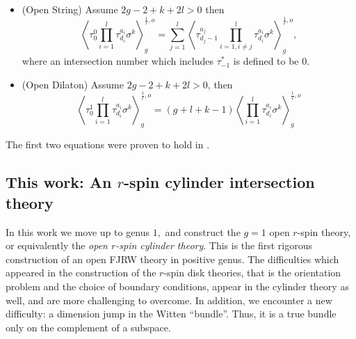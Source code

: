 \documentclass[11pt]{amsart}
\theoremstyle{definition}
\theoremstyle{remark}
\newcommand{\<}{\left<}
\renewcommand{\>}{\right>}
\numberwithin{equation}{section}
\begin{document}
\begin{itemize}
\begin{equation}
\begin{split}
&+\hspace{-0.1cm}\sum_{\substack{J_1 \sqcup J_2 =  [l]\setminus\{1\} \\ k_1+k_2=k}} \hspace{-0.1cm} \binom{k}{k_1}\left\langle \tau^{a_{1}}_{d_{1}}\prod_{i \in J_1} \tau^{a_i}_{d_i}\sigma^{k_1}\right\rangle^{\frac{1}{r},o}_0 \hspace{-0.1cm}\left\langle \prod_{i \in J_2} \tau^{a_i}_{d_i} \sigma^{k_2+1}\right\rangle^{\frac{1}{r}, o}_1\\
&+\frac{1}{2}\left\langle \prod_{i\in [l]}\tau^{a_i}_{d_i}\sigma^{k+1}\right\rangle^{\frac{1}{r},o}_0.
    \end{split}
\end{equation}\label{eq:g=1_trr}
\item[(d)](Open String)
Assume $2g-2+k+2l>0$ then
\begin{equation}\label{eq:open_string}
\left\langle\tau^0_0\prod_{i=1}^l\tau^{a_i}_{d_i}\sigma^k\right\rangle^{\frac{1}{r},o}_g=\sum_{j=1}^l\left\langle\tau^{a_j}_{d_j-1}\prod_{i=1,i\neq j}^l\tau^{a_i}_{d_i}\sigma^k\right\rangle^{\frac{1}{r},o}_g,
\end{equation}
where an intersection number which includes $\tau^*_{-1}$ is defined to be $0.$
\item[(e)](Open Dilaton)
Assume $2g-2+k+2l>0$, then
\begin{equation}\label{eq:open_dilaton}
\left\langle\tau^1_0\prod_{i=1}^l\tau^{a_i}_{d_i}\sigma^k\right\rangle^{\frac{1}{r},o}_g=(g+l+k-1)\left\langle\prod_{i=1}^l\tau^{a_i}_{d_i}\sigma^k\right\rangle^{\frac{1}{r},o}_g
\end{equation}
\end{itemize}
The first two equations were proven to hold in \cite{BCT2}.



\subsection{This work: An $r$-spin cylinder intersection theory}
In this work we move up to genus $1,$ and construct the $g=1$ open $r$-spin theory, or equivalently the \emph{open $r$-spin cylinder theory}. This is the first rigorous construction of an open FJRW theory in positive genus.
The difficulties which appeared in the construction of the $r$-spin disk theories, that is the orientation problem and the choice of boundary conditions, appear in the cylinder theory as well, and are more challenging to overcome. In addition, we encounter a new difficulty: a dimension jump in the Witten ``bundle''. Thus, it is a true bundle only on the complement of a subspace.
\end{document}
